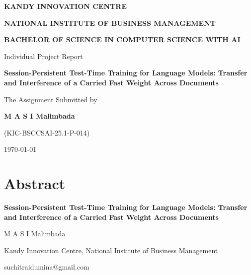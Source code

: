 \documentclass[12pt,a4paper]{report}
\makeatletter
\newcommand{\reporttitle}{Session-Persistent Test-Time Training for Language Models: Transfer and Interference of a Carried Fast Weight Across Documents}
\newcommand{\authorname}{M A S I Malimbada}
\newcommand{\regno}{KIC-BSCCSAI-25.1-P-014}
\newcommand{\affiliation}{Kandy Innovation Centre, National Institute of Business Management}
\newcommand{\authoremail}{suchitraidumina@gmail.com}
\makeatother
\begin{document}
\begin{titlepage}
\centering
\vspace*{1cm}

{\bfseries\Large KANDY INNOVATION CENTRE\par}
\vspace{0.3cm}

{\bfseries\Large NATIONAL INSTITUTE OF BUSINESS MANAGEMENT\par}
\vspace{0.3cm}

{\bfseries\large BACHELOR OF SCIENCE IN COMPUTER SCIENCE WITH AI\par}

\vspace{2.5cm}

{\Large Individual Project Report\par}

\vspace{2.5cm}

{\LARGE\bfseries \reporttitle\par}

\vspace{3cm}

{\large The Assignment Submitted by\par}
\vspace{0.4cm}

{\large\bfseries \authorname\par}
{\large (\regno)\par}

\vfill

{\large \today\par}

\end{titlepage}
\setcounter{page}{2}

\chapter*{Abstract}
{}

\begin{center}
{\bfseries \reporttitle\par}
\vspace{0.3cm}
\authorname\par
\affiliation\par
\authoremail\par
\end{center}
\vspace{0.3cm}
\end{document}
